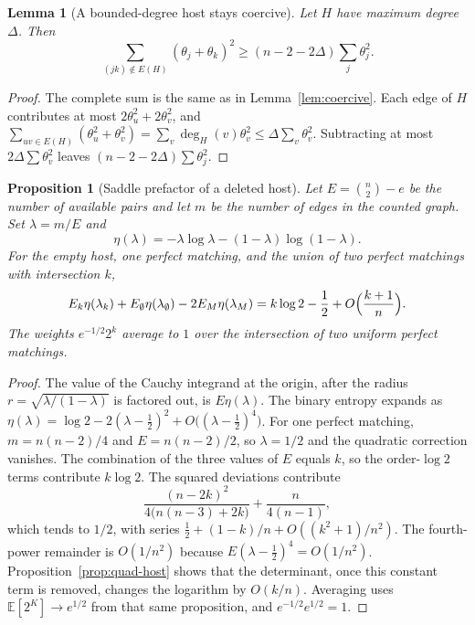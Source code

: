 \documentclass[11pt]{article}
\newtheorem{lemma}[theorem]{Lemma}
\newtheorem{proposition}[theorem]{Proposition}
\newcommand{\EE}{\mathbb{E}}
\begin{document}
\begin{lemma}[A bounded-degree host stays coercive]
\label{lem:coercive-bound}
Let \(H\) have maximum degree \(\Delta\). Then
\[
\sum_{(jk)\notin E(H)}(\theta_j+\theta_k)^2
\ge
(n-2-2\Delta)\sum_j\theta_j^2.
\]
\end{lemma}

\begin{proof}
The complete sum is the same as in Lemma~\ref{lem:coercive}.
Each edge of \(H\) contributes at most \(2\theta_u^2+2\theta_v^2\), and
\(\sum_{uv\in E(H)}(\theta_u^2+\theta_v^2)=\sum_v\deg_H(v)\theta_v^2\le\Delta\sum_v\theta_v^2\).
Subtracting at most \(2\Delta\sum\theta_v^2\) leaves \((n-2-2\Delta)\sum\theta_j^2\).
\end{proof}

\begin{proposition}[Saddle prefactor of a deleted host]
\label{prop:saddle-prefactor}
Let \(E=\binom{n}{2}-e\) be the number of available pairs and let \(m\) be the number of edges in the counted graph. Set \(\lambda=m/E\) and
\[
\eta(\lambda)=-\lambda\log\lambda-(1-\lambda)\log(1-\lambda).
\]
For the empty host, one perfect matching, and the union of two perfect matchings with intersection \(k\),
\[
E_k\eta(\lambda_k)+E_\emptyset\eta(\lambda_\emptyset)-2E_M\eta(\lambda_M)
=
k\log 2-\frac12+O\Bigl(\frac{k+1}{n}\Bigr).
\]
The weights \(e^{-1/2}2^{k}\) average to \(1\) over the intersection of two uniform perfect matchings.
\end{proposition}

\begin{proof}
The value of the Cauchy integrand at the origin, after the radius \(r=\sqrt{\lambda/(1-\lambda)}\) is factored out, is \(E\eta(\lambda)\).
The binary entropy expands as \(\eta(\lambda)=\log 2-2(\lambda-\tfrac12)^2+O\bigl((\lambda-\tfrac12)^4\bigr)\).
For one perfect matching, \(m=n(n-2)/4\) and \(E=n(n-2)/2\), so \(\lambda=1/2\) and the quadratic correction vanishes.
The combination of the three values of \(E\) equals \(k\), so the order-\(\log 2\) terms contribute \(k\log 2\).
The squared deviations contribute
\[
\frac{(n-2k)^2}{4\bigl(n(n-3)+2k\bigr)}+\frac{n}{4(n-1)},
\]
which tends to \(1/2\), with series \(\tfrac12+(1-k)/n+O((k^2+1)/n^2)\).
The fourth-power remainder is \(O(1/n^2)\) because \(E(\lambda-\tfrac12)^4=O(1/n^2)\).
Proposition~\ref{prop:quad-host} shows that the determinant, once this constant term is removed, changes the logarithm by \(O(k/n)\).
Averaging uses \(\EE[2^{K}]\to e^{1/2}\) from that same proposition, and \(e^{-1/2}e^{1/2}=1\).
\end{proof}
\end{document}
